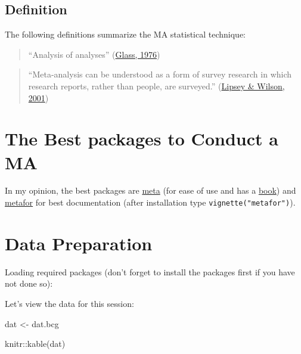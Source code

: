 \documentclass[
  11pt,
]{article}
\newenvironment{Shaded}{\begin{snugshade}}{\end{snugshade}}
\newcommand{\FunctionTok}[1]{\textcolor[rgb]{0.00,0.00,0.00}{#1}}
\newcommand{\NormalTok}[1]{#1}
\newcommand{\OtherTok}[1]{\textcolor[rgb]{0.56,0.35,0.01}{#1}}
\newcommand{\SpecialCharTok}[1]{\textcolor[rgb]{0.00,0.00,0.00}{#1}}
\begin{document}
\hypertarget{definition}{%
\subsection{Definition}\label{definition}}

The following definitions summarize the MA statistical technique:

\begin{quote}
``Analysis of analyses'' (\protect\hyperlink{ref-glass1976}{Glass, 1976})
\end{quote}

\begin{quote}
``Meta-analysis can be understood as a form of survey research in which research reports, rather than people, are surveyed.'' (\protect\hyperlink{ref-lipsey2001}{Lipsey \& Wilson, 2001})
\end{quote}

\hypertarget{the-best-packages-to-conduct-a-ma}{%
\section{The Best packages to Conduct a MA}\label{the-best-packages-to-conduct-a-ma}}

In my opinion, the best packages are \href{https://github.com/guido-s/meta/}{meta} (for ease of use and has a \href{https://www.springer.com/gp/book/9783319214153}{book}) and \href{https://www.metafor-project.org/doku.php}{metafor} for best documentation (after installation type \texttt{vignette("metafor")}).

\hypertarget{data-preparation}{%
\section{Data Preparation}\label{data-preparation}}

Loading required packages (don't forget to install the packages first if you have not done so):

Let's view the data for this session:

\begin{Shaded}
\begin{Highlighting}[]
\NormalTok{dat }\OtherTok{\textless{}{-}}\NormalTok{ dat.bcg}

\NormalTok{knitr}\SpecialCharTok{::}\FunctionTok{kable}\NormalTok{(dat)}
\end{Highlighting}
\end{Shaded}
\end{document}
